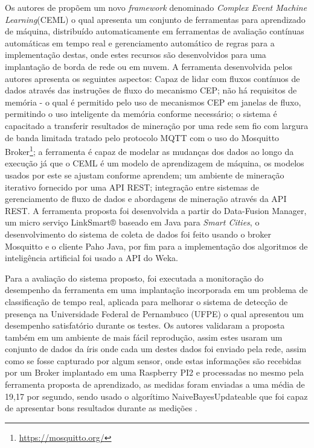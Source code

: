 \documentclass[ti,table]{texufpel} %
\begin{document}
     Os autores de \cite{art10soto2016ceml} propõem um novo \textit{framework} denominado \textit{Complex Event Machine Learning}(CEML) o qual apresenta um conjunto de ferramentas para aprendizado de máquina, distribuído automaticamente em ferramentas de avaliação contínuas automáticas em tempo real e gerenciamento automático de regras para a implementação destas, onde estes recursos são desenvolvidos para uma implantação de borda de rede ou em nuvem. A ferramenta desenvolvida pelos autores apresenta os seguintes aspectos: Capaz de lidar com fluxos contínuos de dados através das instruções de fluxo do mecanismo CEP; não há requisitos de memória - o qual é permitido pelo uso de mecanismos CEP em janelas de fluxo, permitindo o uso inteligente da memória conforme necessário; o sistema é capacitado a transferir resultados de mineração por uma rede sem fio com largura de banda limitada tratado pelo protocolo MQTT com o uso do Mosquitto Broker\footnote{\url{https://mosquitto.org/}}; a ferramenta é capaz de modelar as mudanças dos dados ao longo da execução já que o CEML é um modelo de aprendizagem de máquina, os modelos usados por este se ajustam conforme aprendem; um ambiente de mineração iterativo fornecido por uma API REST; integração entre sistemas de gerenciamento de fluxo de dados e abordagens de mineração através da API REST. A ferramenta proposta foi desenvolvida a partir do Data-Fusion Manager, um micro serviço LinkSmart® baseado em Java para \textit{Smart Cities}, o desenvolvimento do sistema de coleta de dados foi feito usando o broker Mosquitto e o cliente Paho Java, por fim para a implementação dos algoritmos de inteligência artificial foi usado a API do Weka.  

     

     Para a avaliação do sistema proposto, foi executada a monitoração do desempenho da ferramenta em uma implantação incorporada em um problema de classificação de tempo real, aplicada para melhorar o sistema de detecção de presença na Universidade Federal de Pernambuco (UFPE) o qual apresentou um desempenho satisfatório durante os testes. Os autores validaram a proposta também em um ambiente de mais fácil reprodução, assim estes usaram um conjunto de dados da íris onde cada um destes dados foi enviado pela rede, assim como se fosse capturado por algum sensor,  onde estas informações são recebidas por um Broker implantado em uma Raspberry PI2 e processadas no mesmo pela ferramenta proposta de aprendizado, as medidas foram enviadas a uma média de 19,17 por segundo, sendo usado o algorítimo NaiveBayesUpdateable que foi capaz de apresentar bons resultados durante as medições \cite{art10soto2016ceml}. 
\end{document}
